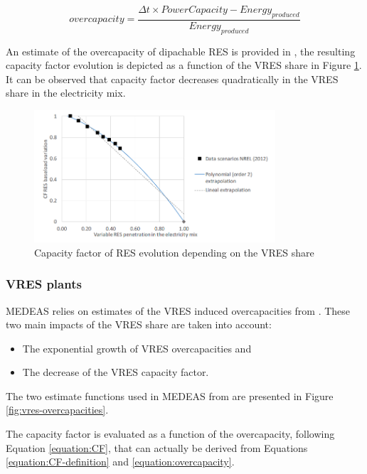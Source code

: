 \begin{equation}
    overcapacity = \frac{\Delta t \times PowerCapacity - Energy_{produced}}{Energy_{produced}}
    \label{equation:overcapacity}
\end{equation}

An estimate of the overcapacity of dipachable RES is provided in \cite{NREL}, the resulting capacity factor evolution is depicted as a function of the VRES share in Figure \ref{fig:cfres-vreshare}. It can be observed that capacity factor decreases quadratically in the VRES share in the electricity mix.

\begin{figure}[h]
    \includegraphics[width=0.8\textwidth]{resources/images/cfres-vreshsare.png}
    \caption{Capacity factor of RES evolution depending on the VRES share \cite{NREL}}
    \label{fig:cfres-vreshare}
\end{figure}

\subsubsection{VRES plants}

MEDEAS relies on estimates of the VRES induced overcapacities from \cite{delarue}. These two main impacts of the VRES share are taken into account:
\begin{itemize}
    \item The exponential growth of VRES overcapacities and
    \item The decrease of the VRES capacity factor.
\end{itemize}

The two estimate functions used in MEDEAS \cite{medeas-eroi} from \cite{delarue} are presented in Figure \ref{fig:vres-overcapacities}.

The capacity factor is evaluated as a function of the overcapacity, following Equation \ref{equation:CF}, that can actually be derived from Equations \ref{equation:CF-definition} and \ref{equation:overcapacity}.

